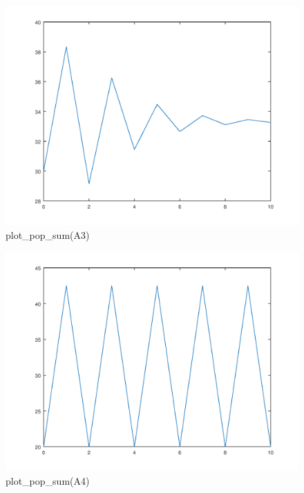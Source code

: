 \documentclass{article}
\begin{document}
\begin{figure}[H]
\centering
\includegraphics[scale=0.5]{plotA3.png}
\caption{plot\_pop\_sum(A3)}
\label{fig:universe}
\end{figure}

\begin{figure}[H]
\centering
\includegraphics[scale=0.5]{plotA4.png}
\caption{plot\_pop\_sum(A4)}
\label{fig:universe}
\end{figure}
\end{document}
